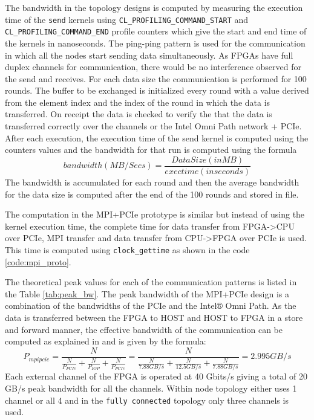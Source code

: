 The bandwidth in the topology designs is computed by measuring the execution time
of the \texttt{send} kernels using \texttt{CL\_PROFILING\_COMMAND\_START}
and \texttt{CL\_PROFILING\_COMMAND\_END} profile counters which give the start and
end time of the kernels in nanoseconds. The ping-ping pattern is used for the
communication in which all the nodes start sending data simultaneously.
As FPGAs have full duplex channels for communication, there would be no interference
observed for the send and receives. For each data size the communication is performed
for 100 rounds. The buffer to be exchanged is initialized every round with a value derived from the
element index and the index of the round in which the data is transferred. On receipt
the data is checked to verify the that the data is transferred correctly over the channels
or the Intel Omni Path network + PCIe. After each execution, the execution time of the send kernel
is computed using the counters values and the bandwidth for that run is computed using the formula
$$ bandwidth (MB/Secs) = \frac{Data Size (in MB)}{exectime (in seconds)} $$
The bandwidth is accumulated for each round and then the average bandwidth for the
data size is computed after the end of the 100 rounds and stored in file.

The computation in the MPI+PCIe prototype is similar but instead of using the kernel execution
time, the complete time for data transfer from FPGA->CPU over PCIe, MPI transfer and data transfer from
CPU->FPGA over PCIe is used. This time is computed using \texttt{clock\_gettime} as shown in the code
\ref{code:mpi_proto}.

The theoretical peak values for each of the communication patterns is listed in the Table \ref{tab:peak_bw}.
The peak bandwidth of the MPI+PCIe design is a combination of the bandwidths of the PCIe
and the Intel® Omni Path. As the data is transferred between the FPGA to HOST and HOST to FPGA
in a store and forward manner, the effective bandwidth of the communication can be computed as
explained in \cite{kobayashi_opencl-ready_2018} and is given by the formula:
\begin{equation}\label{eqn:peakbw_mpipcie}
 P_{mpipcie} = \frac{N}{\frac{N}{P_{PCIe}}+\frac{N}{P_{IOP}}+\frac{N}{P_{PCIe}}}
 = \frac{N}{\frac{N}{7.88 GB/s}+\frac{N}{12.5 GB/s}+\frac{N}{7.88 GB/s}} = 2.995 GB/s
\end{equation}
Each external channel of the FPGA is operated at 40 Gbits/s giving a total of 20 GB/s peak
bandwidth for all the channels. Within node topology either uses 1 channel or all 4 and in the
\texttt{fully connected} topology only three channels is used.

